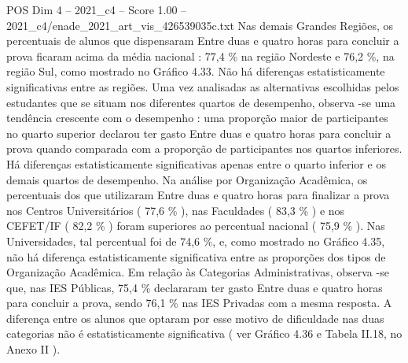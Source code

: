 \begin{textsample}{POS Dim 4 – 2021\_c4 – Score 1.00 – 2021\_c4/enade\_2021\_art\_vis\_426539035c.txt}
Nas demais Grandes Regiões, os percentuais de alunos que dispensaram Entre duas e quatro horas para concluir a prova ficaram acima da média nacional : 77,4 \% na região Nordeste e 76,2 \%, na região Sul, como mostrado no Gráfico 4.33.
Não há diferenças estatisticamente significativas entre as regiões.
Uma vez analisadas as alternativas escolhidas pelos estudantes que se situam nos diferentes quartos de desempenho, observa -se uma tendência crescente com o desempenho : uma proporção maior de participantes no quarto superior declarou ter gasto Entre duas e quatro horas para concluir a prova quando comparada com a proporção de participantes nos quartos inferiores.
Há diferenças estatisticamente significativas apenas entre o quarto inferior e os demais quartos de desempenho.
Na análise por Organização Acadêmica, os percentuais dos que utilizaram Entre duas e quatro horas para finalizar a prova nos Centros Universitários ( 77,6 \% ), nas Faculdades ( 83,3 \% ) e nos CEFET/IF ( 82,2 \% ) foram superiores ao percentual nacional ( 75,9 \% ).
Nas Universidades, tal percentual foi de 74,6 \%, e, como mostrado no Gráfico 4.35, não há diferença estatisticamente significativa entre as proporções dos tipos de Organização Acadêmica.
Em relação às Categorias Administrativas, observa -se que, nas IES Públicas, 75,4 \% declararam ter gasto Entre duas e quatro horas para concluir a prova, sendo 76,1 \% nas IES Privadas com a mesma resposta.
A diferença entre os alunos que optaram por esse motivo de dificuldade nas duas categorias não é estatisticamente significativa ( ver Gráfico 4.36 e Tabela II.18, no Anexo II ).

\end{textsample}
